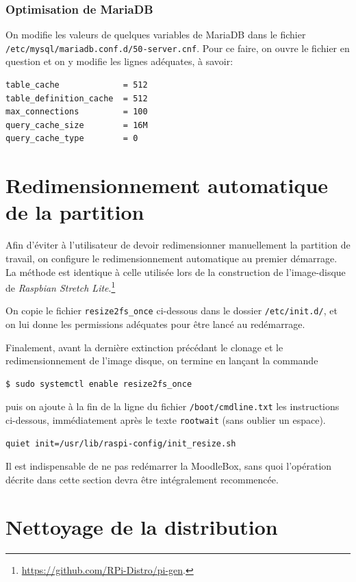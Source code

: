 \documentclass[12pt]{article}
\begin{document}
\subsubsection{Optimisation de MariaDB}

On modifie les valeurs de quelques variables de MariaDB dans le fichier \lstinline{/etc/mysql/mariadb.conf.d/50-server.cnf}.
Pour ce faire, on ouvre le fichier en question et on y modifie les lignes adéquates, à savoir:
\begin{lstlisting}[language=bash]
table_cache             = 512
table_definition_cache  = 512
max_connections         = 100
query_cache_size        = 16M
query_cache_type        = 0
\end{lstlisting}

\section{Redimensionnement automatique de la partition}

Afin d'éviter à l'utilisateur de devoir redimensionner manuellement la partition de travail, on configure le redimensionnement automatique au premier démarrage.
La méthode est identique à celle utilisée lors de la construction de l'image-disque de \emph{Raspbian Stretch Lite}.\footnote{\url{https://github.com/RPi-Distro/pi-gen}.}

On copie le fichier \lstinline{resize2fs_once} ci-dessous dans le dossier \lstinline{/etc/init.d/}, et on lui donne les permissions adéquates pour être lancé au redémarrage.


Finalement, avant la dernière extinction précédant le clonage et le redimensionnement de l'image disque, on termine en lançant la commande
\begin{lstlisting}[language=bash]
$ sudo systemctl enable resize2fs_once
\end{lstlisting}
puis on ajoute à la fin de la ligne du fichier \lstinline{/boot/cmdline.txt} les instructions ci-dessous, immédiatement après le texte \lstinline{rootwait} (sans oublier un espace).
\begin{lstlisting}[language=bash]
quiet init=/usr/lib/raspi-config/init_resize.sh
\end{lstlisting}

Il est indispensable de ne pas redémarrer la MoodleBox, sans quoi l'opération décrite dans cette section devra être intégralement recommencée.

\section{Nettoyage de la distribution}
\end{document}
